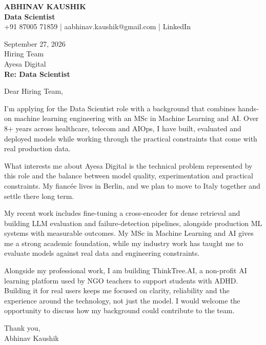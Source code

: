 \documentclass[10pt,a4paper]{article}
\begin{document}
\begin{center}
{\Large\bfseries ABHINAV KAUSHIK}\\[2pt]
{\bfseries Data Scientist}\\[2pt]
+91 87005 71859 \quad | \quad aabhinav.kaushik@gmail.com \quad | \quad LinkedIn
\end{center}
\vspace{8pt}
September 27, 2026\\[6pt]
Hiring Team\\
Ayesa Digital\\[4pt]
\textbf{Re: Data Scientist}

Dear Hiring Team,

I’m applying for the Data Scientist role with a background that combines hands-on machine learning engineering with an MSc in Machine Learning and AI. Over 8+ years across healthcare, telecom and AIOps, I have built, evaluated and deployed models while working through the practical constraints that come with real production data.

What interests me about Ayesa Digital is the technical problem represented by this role and the balance between model quality, experimentation and practical constraints. My fiancée lives in Berlin, and we plan to move to Italy together and settle there long term.

My recent work includes fine-tuning a cross-encoder for dense retrieval and building LLM evaluation and failure-detection pipelines, alongside production ML systems with measurable outcomes. My MSc in Machine Learning and AI gives me a strong academic foundation, while my industry work has taught me to evaluate models against real data and engineering constraints.

Alongside my professional work, I am building ThinkTree.AI, a non-profit AI learning platform used by NGO teachers to support students with ADHD. Building it for real users keeps me focused on clarity, reliability and the experience around the technology, not just the model. I would welcome the opportunity to discuss how my background could contribute to the team.

Thank you,\\
Abhinav Kaushik
\end{document}
